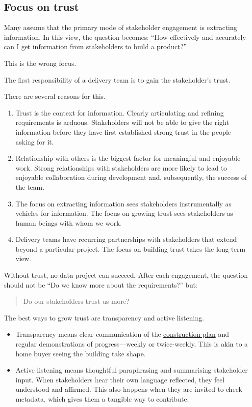 \documentclass[10pt,openany,10pt]{book}
\begin{document}
\subsection{Focus on trust}\label{focus-on-trust}

Many assume that the primary mode of stakeholder engagement is
extracting information. In this view, the question becomes: ``How
effectively and accurately can I get information from stakeholders to
build a product?''

This is the wrong focus.

The first responsibility of a delivery team is to gain the stakeholder's
trust.

There are several reasons for this.

\begin{enumerate}
\def\labelenumi{\arabic{enumi}.}
\item
  Trust is the context for information. Clearly articulating and
  refining requirements is arduous. Stakeholders will not be able to
  give the right information before they have first established strong
  trust in the people asking for it.
\item
  Relationship with others is the biggest factor for meaningful and
  enjoyable work. Strong relationships with stakeholders are more likely
  to lead to enjoyable collaboration during development and,
  subsequently, the success of the team.
\item
  The focus on extracting information sees stakeholders instrumentally
  as vehicles for information. The focus on growing trust sees
  stakeholders as human beings with whom we work.
\item
  Delivery teams have recurring partnerships with stakeholders that
  extend beyond a particular project. The focus on building trust takes
  the long-term view.
\end{enumerate}

Without trust, no data project can succeed. After each engagement, the
question should not be ``Do we know more about the requirements?'' but:

\begin{quote}
Do our stakeholders trust us more?
\end{quote}

The best ways to grow trust are transparency and active listening.

\begin{itemize}
\item
  Transparency means clear communication of the
  \hyperref[docs-judgement-under-ambiguity-construction-planning]{construction
  plan} and regular demonstrations of progress---weekly or twice-weekly.
  This is akin to a home buyer seeing the building take shape.
\item
  Active listening means thoughtful paraphrasing and summarising
  stakeholder input. When stakeholders hear their own language
  reflected, they feel understood and affirmed. This also happens when
  they are invited to check metadata, which gives them a tangible way to
  contribute.
\end{itemize}
\end{document}
